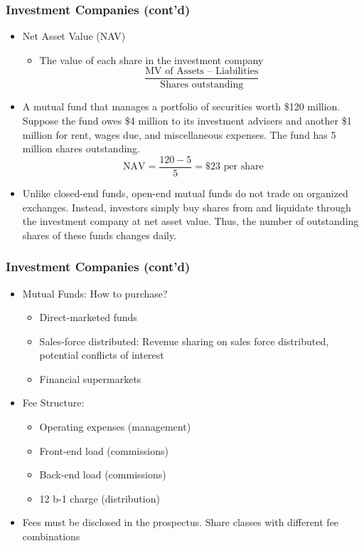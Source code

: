\documentclass[10pt]{beamer}
\begin{document}
	
	\begin{frame}
		\frametitle{Investment Companies (cont'd)}
		
		\begin{itemize} 
			\item Net Asset Value (NAV)
			
			\begin{itemize}
				\item The value of each share in the investment company
				$$
				\frac{\text{MV of Assets -- Liabilities}}{\text{Shares outstanding}}
				$$
			\end{itemize}
			
			
			\item A mutual fund that manages a portfolio of securities worth \$120 million. Suppose the fund owes \$4 million to its investment advisers and another \$1 million for rent, wages due, and miscellaneous expenses. The fund has 5 million shares outstanding.
			$$
			\text{NAV} = \frac{120 - 5}{5} = \$23 \text{ per share}
			$$
			
			\item Unlike closed-end funds, open-end mutual funds do not trade on organized exchanges. Instead, investors simply buy shares from and liquidate through the investment company at net asset value. Thus, the number of outstanding shares of these funds	changes daily.
		\end{itemize}
		
	\end{frame}
	
	
	
	
	\begin{frame}
		\frametitle{Investment Companies (cont'd)}
		
		\begin{itemize} 
			\item Mutual Funds: How to purchase?
			
			\begin{itemize}
				\item Direct-marketed funds
				\item Sales-force distributed: Revenue sharing on sales force distributed, potential conflicts of interest
				\item Financial supermarkets 
			\end{itemize}
			
			
			\item Fee Structure:
			\begin{itemize}
				\item Operating expenses (management)
				\item Front-end load (commissions)
				\item Back-end load (commissions)
				\item 12 b-1 charge (distribution)
			\end{itemize}
			
			\item Fees must be disclosed in the prospectus. Share classes with different fee combinations
			
		\end{itemize}
		
	\end{frame}
	
\end{document}
